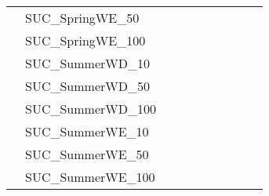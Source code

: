 \begin{table}[]
{\begin{tabular}{|c|l|ll|ll|ll|l|l|}
			& SUC\_SpringWE\_50             &                                   &                                  &                           &                          &                           &                          &                                       &                                \\
			& SUC\_SpringWE\_100            &                                   &                                  &                           &                          &                           &                          &                                       &                                \\
			& SUC\_SummerWD\_10             &                                   &                                  &                           &                          &                           &                          &                                       &                                \\
			& SUC\_SummerWD\_50             &                                   &                                  &                           &                          &                           &                          &                                       &                                \\
			& SUC\_SummerWD\_100            &                                   &                                  &                           &                          &                           &                          &                                       &                                \\
			& SUC\_SummerWE\_10             &                                   &                                  &                           &                          &                           &                          &                                       &                                \\
			& SUC\_SummerWE\_50             &                                   &                                  &                           &                          &                           &                          &                                       &                                \\
			& SUC\_SummerWE\_100            &                                   &                                  &                           &                          &                           &                          &                                       &                                \\ \hline
		\end{tabular}%
	}
\end{table}